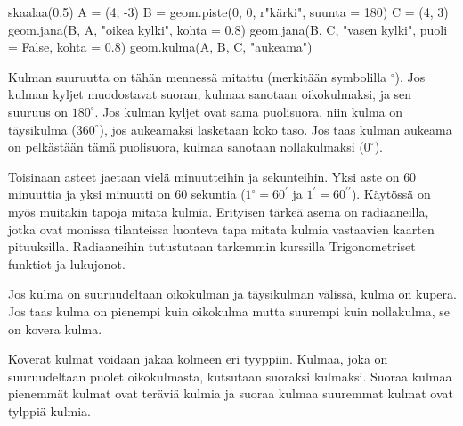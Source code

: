 \begin{center}
\begin{kuva}
	skaalaa(0.5)
	A = (4, -3)
	B = geom.piste(0, 0, r"k\"{a}rki", suunta = 180)
	C = (4, 3)
	geom.jana(B, A, "oikea kylki", kohta = 0.8)
	geom.jana(B, C, "vasen kylki", puoli = False, kohta = 0.8)
	geom.kulma(A, B, C, "aukeama")
\end{kuva}
\end{center}

Kulman suuruutta on tähän mennessä mitattu  (merkitään symbolilla $^{\circ}$). Jos kulman kyljet muodostavat suoran,
kulmaa sanotaan oikokulmaksi, ja sen suuruus on $180^{\circ}$.
Jos kulman kyljet ovat sama puolisuora, niin kulma on täysikulma ($360^{\circ}$), jos aukeamaksi lasketaan
koko taso. Jos taas kulman aukeama on pelkästään tämä puolisuora, kulmaa sanotaan
nollakulmaksi ($0^{\circ}$).

Toisinaan asteet jaetaan vielä minuutteihin ja sekunteihin. Yksi aste on $60$ minuuttia ja
yksi minuutti on $60$ sekuntia ($1^{\circ} = 60^{\prime}$ ja $1^{\prime} = 
60^{\prime \prime}$).
Käytössä on myös muitakin tapoja mitata kulmia. Erityisen tärkeä asema on radiaaneilla, jotka
ovat monissa tilanteissa luonteva tapa mitata kulmia vastaavien kaarten pituuksilla. Radiaaneihin
tutustutaan tarkemmin kurssilla Trigonometriset funktiot ja lukujonot.


Jos kulma on
suuruudeltaan oikokulman ja täysikulman välissä, kulma on kupera. Jos taas kulma on pienempi
kuin oikokulma mutta suurempi kuin nollakulma, se on kovera kulma.

Koverat kulmat voidaan jakaa kolmeen eri tyyppiin. Kulmaa, joka on suuruudeltaan puolet
oikokulmasta, kutsutaan suoraksi kulmaksi. Suoraa kulmaa pienemmät kulmat ovat teräviä
kulmia ja suoraa kulmaa suuremmat kulmat ovat tylppiä kulmia.

